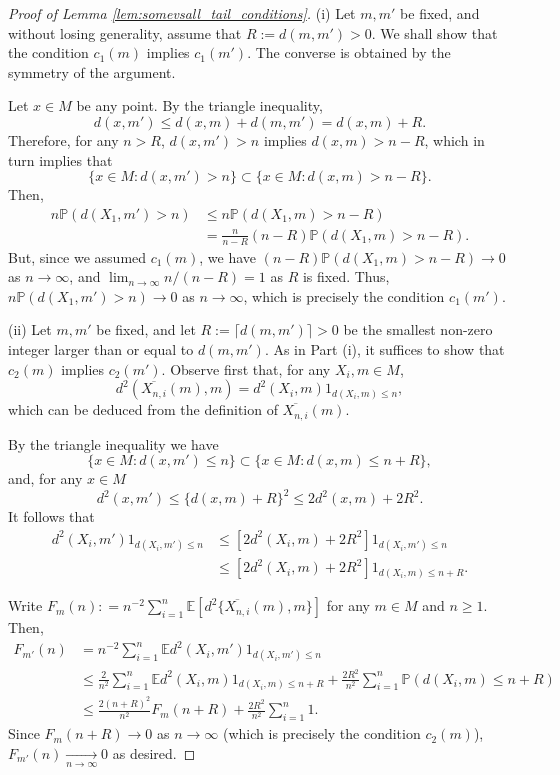 \documentclass[10pt,a4paper]{amsart}
\begin{document}
\begin{proof}[Proof of Lemma \ref{lem:somevsall_tail_conditions}]
(i) Let $m, m'$ be fixed, and without losing generality, assume that $R:= d(m,m') > 0$. We shall show that the condition $c_1(m)$ implies $c_1(m')$. The converse is obtained by the symmetry of the argument. 

Let $x \in M$ be any point. 
By the triangle inequality, 
\begin{equation}
   d(x,m') \le d(x, m) + d(m,m') = d(x, m) + R. \label{eq:triangle}
\end{equation} 
Therefore, for any $n > R$, $d(x,m') > n$ implies $d(x,m)> n - R$, which in turn implies that 
$$\{x \in M: d(x,m') > n\} \subset \{x \in M: d(x,m)> n - R\}.$$
Then, 
\begin{align*}
    n\mathbb{P}(d(X_1,m')>n) & \le n\mathbb{P}(d(X_1,m)>n-R) \\
      & = \frac{n}{n-R} (n-R) \mathbb{P}(d(X_1,m)>n-R).
\end{align*}
But, since we assumed $c_1(m)$, we have $(n-R) \mathbb{P}(d(X_1,m)>n-R) \to 0$ as $n\to\infty$, and $\lim_{n\to\infty}{n}/({n-R})= 1$ as $R$ is fixed. Thus, $n\mathbb{P}(d(X_1,m')>n) \to 0$ as $n\to\infty$, which is precisely the condition $c_1(m')$. 

(ii) Let $m, m'$ be fixed, and let $R:= \lceil d(m,m') \rceil > 0$ be the smallest non-zero integer larger than or equal to $d(m,m')$. As in Part (i), it suffices to show that $c_2(m)$ implies $c_2(m')$. 
Observe first that, for any $X_i,m \in M$, 
$$d^2(\overline{X_{n,i}}(m),m) = d^2(X_i,m) 1_{d(X_i,m) \le n},$$
which can be deduced from the definition of $\overline{X_{n,i}}(m)$. 

By the triangle inequality %
we have 
$$\{x \in M: d(x,m') \le n\} \subset \{x \in M: d(x,m)\le n + R\},$$ 
and, for any $x \in M$ 
$$d^2(x,m') \le \{d(x,m) + R\}^2 \le 2d^2(x,m) + 2R^2.$$
It follows that
\begin{align*}
    d^2(X_i,m') 1_{d(X_i,m') \le n} 
    & \le [2d^2(X_i,m) + 2R^2]1_{d(X_i,m') \le n} \\ 
    & \le [2d^2(X_i,m) + 2R^2]1_{d(X_i,m)\le n + R}.
\end{align*}

Write $F_m(n) : = n^{-2}\sum_{i=1}^n\mathbb{E}[d^2\{\overline{X_{n,i}}(m),m\}]$ for any $m\in M$ and $n\ge 1$. Then, 
\begin{align*}
    F_{m'}(n) & = n^{-2}\sum_{i=1}^n\mathbb{E} d^2(X_i,m') 1_{d(X_i,m') \le n}  \\
    & \le \frac{2}{n^2}\sum_{i=1}^n\mathbb{E} d^2(X_i,m)1_{d(X_i,m)\le n + R} + \frac{2R^2}{n^2}\sum_{i=1}^n \mathbb{P}(d(X_i,m)\le n + R) \\ 
    & \le \frac{2(n+R)^2}{n^2}F_{m}(n+R) + \frac{2R^2}{n^2}\sum_{i=1}^n 1.
\end{align*}
Since $F_{m}(n+R) \to 0$ as $n\to \infty$ (which is precisely the condition $c_2(m)$), $F_{m'}(n) \underset{n\to \infty}{\to} 0$ as desired. 






\end{proof}
\end{document}
